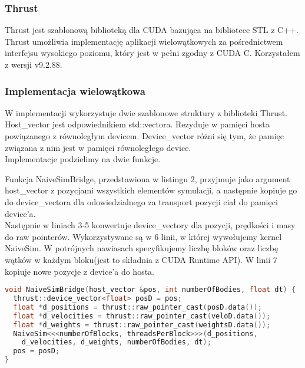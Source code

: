 \documentclass[14pt,twoside,a4paper]{article}
\begin{document}
\subsubsection{\large Thrust}
Thrust jest szablonową biblioteką dla CUDA bazująca na bibliotece STL z C++. Thrust umożliwia implementację aplikacji wielowątkowych za pośrednictwem interfejsu wysokiego poziomu, który jest w pełni zgodny z CUDA C. Korzystałem z wersji v9.2.88. 


\subsubsection{\large Implementacja wielowątkowa}
W implementacji wykorzystuje dwie szablonowe struktury z biblioteki Thrust.
Host\_vector jest odpowiednikiem std::vectora. Rezyduje w pamięci hosta 
powiązanego z równoległym devicem. Device\_vector różni się tym, że pamięc związana 
z nim jest w pamięci równoległego device. \\
Implementacje podzielimy na dwie funkcje.\\
\bigskip

Funkcja NaiveSimBridge, przedstawiona w listingu 2, przyjmuje jako argument host\_vector z pozycjami wszystkich elementów symulacji, a następnie kopiuje go do device\_vectora dla odowiedzialnego za transport pozycji ciał do pamięci device'a. \\Następnie w liniach 3-5 konwertuje device\_vectory dla pozycji, prędkości i masy do raw pointerów. Wykorzystywane są w 6 linii, w której wywołujemy kernel NaiveSim. W potrójnych nawiasach specyfikujemy liczbę bloków oraz liczbę wątków w każdym bloku(jest to składnia z CUDA Runtime API). 
W linii 7 kopiuje nowe pozycje z device'a do hosta. 
\bigskip
\bigskip
\bigskip

\begin{lstlisting}[language=C++, frame=single, framerule=2pt, caption=Bridge pomiędzy główną pętlą a kernelem]
void NaiveSimBridge(host_vector &pos, int numberOfBodies, float dt) {
  thrust::device_vector<float> posD = pos;
  float *d_positions = thrust::raw_pointer_cast(posD.data());
  float *d_velocities = thrust::raw_pointer_cast(veloD.data());
  float *d_weights = thrust::raw_pointer_cast(weightsD.data());
  NaiveSim<<<numberOfBlocks, threadsPerBlock>>>(d_positions, 
  	d_velocities, d_weights, numberOfBodies, dt);
  pos = posD;
}
\end{lstlisting}
\end{document}
